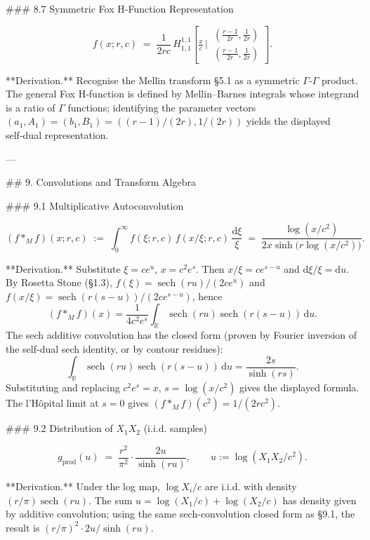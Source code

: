 ### 8.7 Symmetric Fox H‑Function Representation

$$
f(x;r,c) \;=\; \frac{1}{2rc}\,H^{1,1}_{1,1}\!\left[\tfrac{x}{c}\,\Bigg|\,\begin{matrix}(\tfrac{r-1}{2r},\tfrac{1}{2r})\\(\tfrac{r-1}{2r},\tfrac{1}{2r})\end{matrix}\right].
$$

**Derivation.** Recognise the Mellin transform §5.1 as a symmetric $\Gamma$‑$\Gamma$ product. The general Fox H‑function is defined by Mellin–Barnes integrals whose integrand is a ratio of $\Gamma$ functions; identifying the parameter vectors $(a_{1},A_{1}) = (b_{1},B_{1}) = ((r-1)/(2r),1/(2r))$ yields the displayed self‑dual representation.

---

## 9. Convolutions and Transform Algebra

### 9.1 Multiplicative Autoconvolution

$$
(f*_{M}f)(x;r,c) \;:=\; \int_{0}^{\infty}f(\xi;r,c)\,f(x/\xi;r,c)\,\frac{\mathrm d\xi}{\xi} \;=\; \frac{\log(x/c^{2})}{2x\sinh\!\bigl(r\log(x/c^{2})\bigr)}.
$$

**Derivation.** Substitute $\xi = ce^{u}$, $x = c^{2}e^{s}$. Then $x/\xi = ce^{s-u}$ and $\mathrm d\xi/\xi = \mathrm du$. By Rosetta Stone (§1.3), $f(\xi) = \operatorname{sech}(ru)/(2ce^{u})$ and $f(x/\xi) = \operatorname{sech}(r(s-u))/(2ce^{s-u})$, hence
$$
(f*_{M}f)(x) = \frac{1}{4c^{2}e^{s}}\int_{\mathbb R}\operatorname{sech}(ru)\operatorname{sech}(r(s-u))\,\mathrm du.
$$
The sech additive convolution has the closed form (proven by Fourier inversion of the self-dual sech identity, or by contour residues):
$$
\int_{\mathbb R}\operatorname{sech}(ru)\operatorname{sech}(r(s-u))\,\mathrm du = \frac{2s}{\sinh(rs)}.
$$
Substituting and replacing $c^{2}e^{s} = x$, $s = \log(x/c^{2})$ gives the displayed formula. The l'Hôpital limit at $s=0$ gives $(f*_{M}f)(c^{2}) = 1/(2rc^{2})$.

### 9.2 Distribution of $X_{1}X_{2}$ (i.i.d. samples)

$$
g_{\text{prod}}(u) \;=\; \frac{r^{2}}{\pi^{2}}\cdot\frac{2u}{\sinh(ru)},\qquad u := \log(X_{1}X_{2}/c^{2}).
$$

**Derivation.** Under the log map, $\log X_{i}/c$ are i.i.d. with density $(r/\pi)\operatorname{sech}(ru)$. The sum $u = \log(X_{1}/c) + \log(X_{2}/c)$ has density given by additive convolution; using the same sech-convolution closed form as §9.1, the result is $(r/\pi)^{2}\cdot 2u/\sinh(ru)$.

